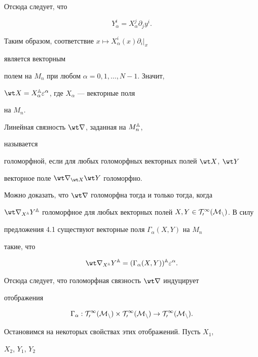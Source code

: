 Отсюда следует, что 


$$ 


Y^i_\alpha=X^j_\alpha\partial_j y^i. 


$$ 


Таким образом, соответствие $x\mapsto X^i_\alpha(x)\partial_i|_x$ 


является векторным  


полем на $M_n$ при любом $\alpha=0,1,\dotsc,N-1$. Значит,


$\wt X=X\A_\alpha\varepsilon^\alpha$, где $X_\alpha$ --- векторные поля 


на $M_n$. 


 


\begin{defns} Линейная связность $\wt\nabla$, заданная на $M^{\Bbb A}_n$, 


называется 


голоморфной, если для любых голоморфных векторных полей $\wt X$, $\wt 


Y$ 


векторное поле $\wt\nabla_{\wt X}\wt Y$ голоморфно. 


\end{defns} 


 


Можно доказать, что $\wt\nabla$ голоморфна тогда и только тогда, когда  


$\wt\nabla_{X\A}Y\A$ голоморфное для любых векторных полей $X,Y\in\cal 


T^1_0(M_n)$. В силу  


предложения 4.1 существуют векторные поля $\Gamma_\alpha(X,Y)$ на $M_n$ 


такие, что 


$$ 


\wt\nabla_{X\A}Y\A=(\Gamma_\alpha(X,Y))\A\varepsilon^\alpha. 


$$ 


Отсюда следует, что голоморфная связность $\wt\nabla$ индуцирует 


отображения 


$$ 


\Gamma_\alpha:\cal T^1_0(M_n)\times\cal T^1_0(M_n)\to 


\cal T^1_0(M_n). 


$$ 


Остановимся на некоторых свойствах этих отображений. Пусть $X_1$, 


$X_2$, $Y_1$, $Y_2$ 


